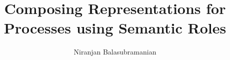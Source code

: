 \documentclass[11pt,onecolumn]{article}
\begin{document}

\title{Composing Representations for Processes using Semantic Roles}
\author{Niranjan Balasubramanian}
\maketitle
\newpage
\thispagestyle{empty}
\newpage
\tableofcontents    %
\thispagestyle{empty}
\setcounter{section}{0}
\setcounter{page}{0}
\newpage
%
\setcounter{page}{1}

%
%


%
%
%

 
{\small


}
\end{document}
